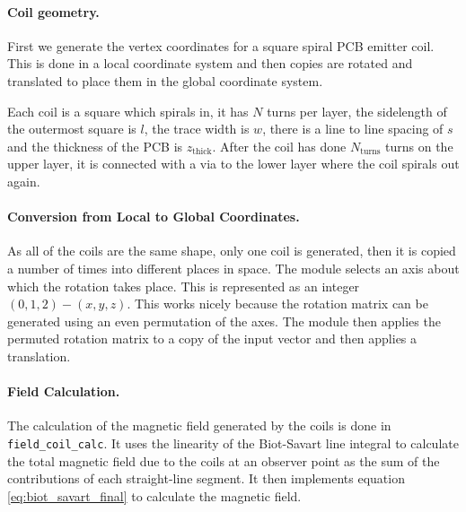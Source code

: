 \paragraph{Coil geometry.}
First we generate the vertex coordinates for a square spiral PCB emitter coil. This is done in a local coordinate system and then copies are rotated and translated to place them in the global coordinate system. 

Each coil is a square which spirals in, it has $N$ turns per layer, the sidelength of the outermost square is $l$, the trace width is $w$, there is a line to line spacing of $s$ and the thickness of the PCB is $z_\mathrm{thick}$. After the coil has done $N_{\mathrm{turns}}$ turns on the upper layer, it is connected with a via to the lower layer where the coil spirals out again. 

\paragraph{Conversion from Local to Global Coordinates.}
As all of the coils are the same shape, only one coil is generated, then it is copied a number of times into different places in space. 
The module selects an axis about which the rotation takes place. This is represented as an integer $(0,1,2) - (x,y,z)$. This works nicely because the rotation matrix can be generated using an even permutation of the axes. The module then applies the permuted rotation matrix to a copy of the input vector and then applies a translation.

\paragraph{Field Calculation.}
The calculation of the magnetic field generated by the coils is done in \lstinline[style=python]|field_coil_calc|. It uses the linearity of the Biot-Savart line integral to calculate the total magnetic field due to the coils at an observer point as the sum of the contributions of each straight-line segment. It then implements equation \eqref{eq:biot_savart_final} to calculate the magnetic field.



